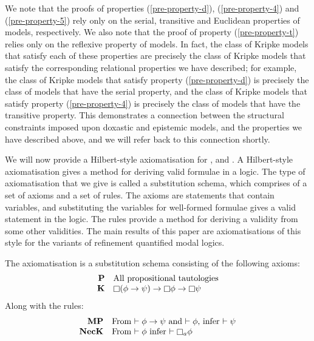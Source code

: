 We note that the proofs of properties (\ref{pre-property-d}),
(\ref{pre-property-4}) and (\ref{pre-property-5}) rely only on the serial,
transitive and Euclidean properties of \classKD{} models, respectively. We also
note that the proof of property (\ref{pre-property-t}) relies only on the
reflexive property of \classS{} models. In fact, the class of Kripke models that
satisfy each of these properties are precisely the class of Kripke models that
satisfy the corresponding relational properties we have described; for example,
the class of Kripke models that satisfy property (\ref{pre-property-d}) is
precisely the class of models that have the serial property, and the class of
Kripke models that satisfy property (\ref{pre-property-4}) is precisely the
class of models that have the transitive property. This demonstrates a
connection between the structural constraints imposed upon doxastic and
epistemic models, and the properties we have described above, and we will refer
back to this connection shortly.

We will now provide a Hilbert-style axiomatisation for \logicK{}, \logicKD{} and
\logicS{}. A Hilbert-style axiomatisation gives a method for deriving valid
formulae in a logic. The type of axiomatisation that we give is called a
substitution schema, which comprises of a set of axioms and a set of rules. The
axioms are statements that contain variables, and substituting the variables for
well-formed formulae gives a valid statement in the logic. The rules provide a
method for deriving a validity from some other validities. The main results of
this paper are axiomatisations of this style for the variants of refinement
quantified modal logics.
 
\begin{definition}
The axiomatisation \axiomK{} is a substitution schema consisting of the
following axioms:
$$
\begin{array}{rl}
{\bf P} & \text{All propositional tautologies}\\
{\bf K} & \knows (\phi \implies \psi) \implies \knows \phi \implies \knows
\psi\\
\end{array}
$$
Along with the rules:
$$
\begin{array}{rl}
{\bf MP} & \text{From $\proves \phi \implies \psi$ and $\proves \phi$, infer
$\proves \psi$}\\
{\bf NecK} & \text{From $\proves \phi$ infer $\proves \knows_a \phi$}\\
\end{array}
$$
\end{definition}

